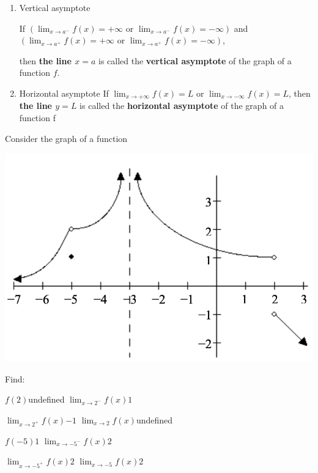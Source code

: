 \begin{myframe}[arc=10pt,auto outer arc]
\begin{enumerate}
\item Vertical asymptote

If $\displaystyle \left( \lim_{x\rightarrow a^-} f\left(x\right) = +\infty \textrm{ or } 
 \lim_{x\rightarrow a^-} f\left(x\right) = -\infty \right)$
and 
$\displaystyle \left( \lim_{x\rightarrow a^+} f\left(x\right) = +\infty  \textrm{ or }  
 \lim_{x\rightarrow a^+} f\left(x\right) = -\infty \right)$,
 
 then \textbf{the line $x=a$} is called the \textbf{vertical asymptote} of
 the graph of a function $f$.
 
 \item Horizontal asymptote
If  $\displaystyle \lim_{x\rightarrow +\infty} f\left(x\right) = L$ or $\displaystyle \lim_{x\rightarrow -\infty} f\left(x\right) = L$, then \textbf{the line $y=L$} is called the \textbf{horizontal asymptote} of the graph of a function f

\end{enumerate}

\end{myframe}

\newpage
\noindent Consider the graph of a function %

\includegraphics[width=0.7\linewidth]{chapter1/limits}

\noindent Find:

\pairofprobsans%
{$\displaystyle f(2)$}{undefined}
{$\displaystyle \lim_{x \rightarrow 2^-} f(x)$}{$\displaystyle 1$}

\pairofprobsans%
{$\displaystyle \lim_{x \rightarrow 2^+} f(x)$}{$\displaystyle -1$}
{$\displaystyle \lim_{x \rightarrow 2} f(x)$}{undefined}

\pairofprobsans%
{$\displaystyle f(-5)$}{$\displaystyle 1$}
{$\displaystyle \lim_{x \rightarrow -5^-} f(x)$}{$\displaystyle 2$}

\pairofprobsans%
{$\displaystyle \lim_{x \rightarrow -5^+} f(x)$}{$\displaystyle 2$}
{$\displaystyle \lim_{x \rightarrow -5} f(x)$}{$\displaystyle 2$}

